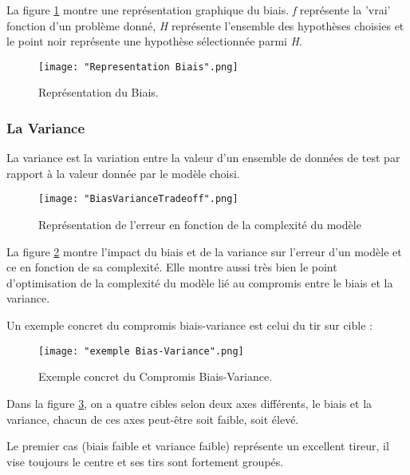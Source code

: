 \documentclass[a4paper]{article}
\begin{document}
La figure \ref{BiasRepresentation} montre une représentation graphique du biais. \textit{f} représente la 'vrai' fonction d'un problème donné, \textit{H} représente l'ensemble des hypothèses choisies et le point noir représente une hypothèse sélectionnée parmi \textit{H}. \newline

\begin{figure}[!h]
	\centering
	\texttt{[image: "Representation Biais".png]}
	\caption{Représentation du Biais.}
	\cite{BiasVarianceTradeoffTextbooksUpdate}
	\label{BiasRepresentation}
\end{figure}

\subsubsection{La Variance}

La variance est la variation entre la valeur d'un ensemble de données de test par rapport à la valeur donnée par le modèle choisi. 

\newpage

\begin{figure}[!h]
	\centering
	\texttt{[image: "BiasVarianceTradeoff".png]}
	\caption{Représentation de l'erreur en fonction de la complexité du modèle}
	\cite{BiasVarianceTradeoffTextbooksUpdate}
	\label{TradeoffRepresentation}
\end{figure}

La figure \ref{TradeoffRepresentation} montre l'impact du biais et de la variance sur l'erreur d'un modèle et ce en fonction de sa complexité. Elle montre aussi très bien le point d'optimisation de la complexité du modèle lié au compromis entre le biais et la variance.

\newpage

Un exemple concret du compromis biais-variance est celui du tir sur cible :

\begin{figure}[!h]
	\centering
	\texttt{[image: "exemple Bias-Variance".png]}
	\caption{Exemple concret du Compromis Biais-Variance.} \cite{UnderstandingBiasVarianceTradeoff}
	\label{ConcreteExample}
\end{figure}

Dans la figure \ref{ConcreteExample}, on a quatre cibles selon deux axes différents, le biais et la variance, chacun de ces axes peut-être soit faible, soit élevé. \par

Le premier cas (biais faible et variance faible) représente un excellent tireur, il vise toujours le centre et ses tirs sont fortement groupés. \par
\end{document}
